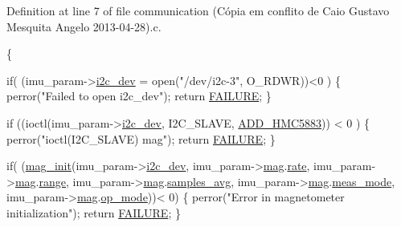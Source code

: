 Definition at line 7 of file communication (\-Cópia em conflito de Caio Gustavo Mesquita Angelo 2013-\/04-\/28).\-c.


\begin{DoxyCode}
\{
  
  \textcolor{keywordflow}{if}( (imu\_param->\hyperlink{structIMU__PARAM__STRUCT_a8a870f383fc9ba0b682fdc9b8c0d2734}{i2c\_dev} = open(\textcolor{stringliteral}{"/dev/i2c-3"}, O\_RDWR))<0 )
  \{
    perror(\textcolor{stringliteral}{"Failed to open i2c\_dev"});
    \textcolor{keywordflow}{return} \hyperlink{communication_01_07C_xC3_xB3pia_01em_01conflito_01de_01Caio_01Gustavo_01Mesquita_01Angelo_012013-04-28_08_8h_a6d58f9ac447476b4e084d7ca383f5183}{FAILURE};
  \}

  \textcolor{keywordflow}{if} ((ioctl(imu\_param->\hyperlink{structIMU__PARAM__STRUCT_a8a870f383fc9ba0b682fdc9b8c0d2734}{i2c\_dev}, I2C\_SLAVE, \hyperlink{imu__functions_01_07C_xC3_xB3pia_01em_01conflito_01de_01Andr_xC3_xA9_01Carvalho_012013-04-26_08_8h_a383c09d3e3bbe30097f7eb8d081fb856}{ADD\_HMC5883})) < 0
      ) \{
                perror(\textcolor{stringliteral}{"ioctl(I2C\_SLAVE) mag"});
                \textcolor{keywordflow}{return} \hyperlink{communication_01_07C_xC3_xB3pia_01em_01conflito_01de_01Caio_01Gustavo_01Mesquita_01Angelo_012013-04-28_08_8h_a6d58f9ac447476b4e084d7ca383f5183}{FAILURE};
  \}

  \textcolor{keywordflow}{if}( (\hyperlink{imu__functions_01_07C_xC3_xB3pia_01em_01conflito_01de_01Andr_xC3_xA9_01Carvalho_012013-04-26_08_8h_a014f908c9faa37c1ec75177a17012a01}{mag\_init}(imu\_param->\hyperlink{structIMU__PARAM__STRUCT_a8a870f383fc9ba0b682fdc9b8c0d2734}{i2c\_dev}, imu\_param->\hyperlink{structIMU__PARAM__STRUCT_a26b277dcaf05f3842995df888225f6f4}{mag}.\hyperlink{structIMU__PARAM__STRUCT_1_1param__mag_a234de95423b604b05b851ef90890cea1}{rate}, 
      imu\_param->\hyperlink{structIMU__PARAM__STRUCT_a26b277dcaf05f3842995df888225f6f4}{mag}.\hyperlink{structIMU__PARAM__STRUCT_1_1param__mag_a40ad27ebdb5fde35257b1dc52e40f476}{range}, imu\_param->\hyperlink{structIMU__PARAM__STRUCT_a26b277dcaf05f3842995df888225f6f4}{mag}.\hyperlink{structIMU__PARAM__STRUCT_1_1param__mag_a52c22cae6940eb39fb72aca66cfeba9a}{samples\_avg}, 
      imu\_param->\hyperlink{structIMU__PARAM__STRUCT_a26b277dcaf05f3842995df888225f6f4}{mag}.\hyperlink{structIMU__PARAM__STRUCT_1_1param__mag_a1f3536709c05310005d648f339d70c54}{meas\_mode}, imu\_param->\hyperlink{structIMU__PARAM__STRUCT_a26b277dcaf05f3842995df888225f6f4}{mag}.\hyperlink{structIMU__PARAM__STRUCT_1_1param__mag_a39b83b3e9ff5bdcafed0bdf6a2de584b}{op\_mode}))< 0)
  \{
      perror(\textcolor{stringliteral}{"Error in magnetometer initialization"});
      \textcolor{keywordflow}{return} \hyperlink{communication_01_07C_xC3_xB3pia_01em_01conflito_01de_01Caio_01Gustavo_01Mesquita_01Angelo_012013-04-28_08_8h_a6d58f9ac447476b4e084d7ca383f5183}{FAILURE};
  \}  


\end{DoxyCode}
